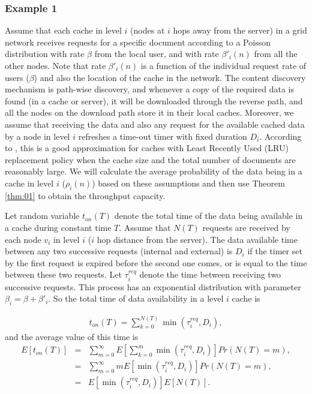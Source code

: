 \documentclass[journal]{IEEEtran}
\theoremstyle{plain}
\theoremstyle{remark}
\begin{document}
 
\subsubsection{Example 1}
\label{ex:01}

Assume that each cache in level $i$ (nodes at $i$ hops away from the server) in a grid network receives requests for a specific document according to a Poisson distribution with rate $\beta$ from the local user, and with rate $\beta'_i(n)$ from all the other nodes. Note that rate $\beta'_i(n)$ is a function of the individual request rate of users ($\beta$) and also the location of the cache in the network. The content discovery mechanism is path-wise discovery, and whenever a copy of the required data is found (in a cache or server), it will be downloaded through the reverse path, and all the nodes on the download path store it in their local caches. Moreover, we assume that receiving the data and also any request for the available cached data by a node in level $i$ refreshes a time-out timer with fixed duration $D_i$. According to \cite{Che2002Hierarchical},  this is a good approximation for caches with Least Recently Used (LRU) replacement policy when the cache size and the total number of documents are reasonably large. We will calculate the average probability of the data being in a cache in level $i$ ($\rho_i(n)$) based on these assumptions and then use Theorem \ref{thm:01} to obtain the throughput capacity.

Let random variable $t_{on}(T)$ denote the total time of the data being available in a cache during constant time $T$. Assume that $N(T)$ requests are received by each node $v_i$ in level $i$ ($i$ hop distance from the server). The data available time between any two successive requests (internal and external) is $D_i$ if the timer set by the first request is expired before the second one comes, or is equal to the time between these two requests. Let $\tau^{req}_i$ denote the time between receiving two successive requests. This process has an exponential distribution with parameter $\beta_i=\beta+\beta'_i$. So the total time of data availability in a level $i$ cache is 

\begin{eqnarray}
t_{on}(T)=\sum_{k=0}^{N(T)} \min(\tau_i^{req},D_i),
\end{eqnarray} 
and the average value of this time is 
\begin{eqnarray}
E[t_{on}(T)]&=&\sum_{m=0}^{\infty} E[\sum_{k=0}^{m} \min(\tau_i^{req},D_i)]Pr(N(T)=m), \nonumber \\
&=&\sum_{m=0}^{\infty} mE[\min(\tau_i^{req},D_i)]Pr(N(T)=m), \nonumber \\
&=&E[\min(\tau_i^{req},D_i)]E[N(T)].
\end{eqnarray}
\end{document}
